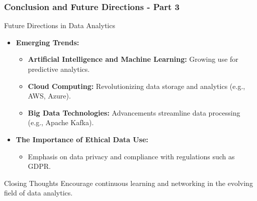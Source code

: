 \documentclass[aspectratio=169]{beamer}
\begin{document}
\begin{frame}[fragile]
    \frametitle{Conclusion and Future Directions - Part 3}
    \begin{block}{Future Directions in Data Analytics}
        \begin{itemize}
            \item \textbf{Emerging Trends:}
            \begin{itemize}
                \item \textbf{Artificial Intelligence and Machine Learning:} Growing use for predictive analytics.
                \item \textbf{Cloud Computing:} Revolutionizing data storage and analytics (e.g., AWS, Azure).
                \item \textbf{Big Data Technologies:} Advancements streamline data processing (e.g., Apache Kafka).
            \end{itemize}

            \item \textbf{The Importance of Ethical Data Use:}
            \begin{itemize}
                \item Emphasis on data privacy and compliance with regulations such as GDPR.
            \end{itemize}
        \end{itemize}
    \end{block}

    \begin{block}{Closing Thoughts}
        Encourage continuous learning and networking in the evolving field of data analytics.
    \end{block}
\end{frame}
\end{document}
